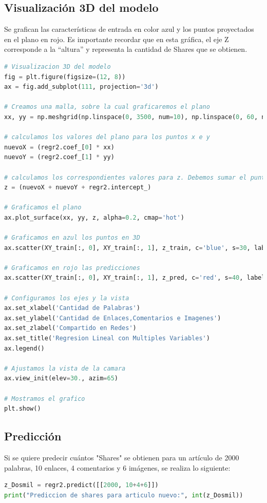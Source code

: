 \documentclass{article}
\begin{document}
\subsection{Visualización 3D del modelo}Se grafican las características de entrada en color azul y los puntos proyectados en el plano en rojo. Es importante recordar que en esta gráfica, el eje Z corresponde a la “altura” y representa la cantidad de Shares que se obtienen.
\begin{lstlisting}[language=Python]
# Visualizacion 3D del modelo
fig = plt.figure(figsize=(12, 8))
ax = fig.add_subplot(111, projection='3d')

# Creamos una malla, sobre la cual graficaremos el plano
xx, yy = np.meshgrid(np.linspace(0, 3500, num=10), np.linspace(0, 60, num=10))
 
# calculamos los valores del plano para los puntos x e y
nuevoX = (regr2.coef_[0] * xx)
nuevoY = (regr2.coef_[1] * yy)

# calculamos los correspondientes valores para z. Debemos sumar el punto de intercepcion
z = (nuevoX + nuevoY + regr2.intercept_)

# Graficamos el plano
ax.plot_surface(xx, yy, z, alpha=0.2, cmap='hot')

# Graficamos en azul los puntos en 3D
ax.scatter(XY_train[:, 0], XY_train[:, 1], z_train, c='blue', s=30, label='Datos reales')

# Graficamos en rojo las predicciones
ax.scatter(XY_train[:, 0], XY_train[:, 1], z_pred, c='red', s=40, label='Predicciones')

# Configuramos los ejes y la vista
ax.set_xlabel('Cantidad de Palabras')
ax.set_ylabel('Cantidad de Enlaces,Comentarios e Imagenes')
ax.set_zlabel('Compartido en Redes')
ax.set_title('Regresion Lineal con Multiples Variables')
ax.legend()

# Ajustamos la vista de la camara
ax.view_init(elev=30., azim=65)

# Mostramos el grafico
plt.show()
\end{lstlisting}

\subsection{Predicción}Si se quiere predecir cuántos "Shares" se obtienen para un artículo de 2000 palabras, 10 enlaces, 4 comentarios y 6 imágenes, se realiza lo siguiente:
\begin{lstlisting}[language=Python]
z_Dosmil = regr2.predict([[2000, 10+4+6]])
print("Prediccion de shares para articulo nuevo:", int(z_Dosmil))
\end{lstlisting}
\end{document}
